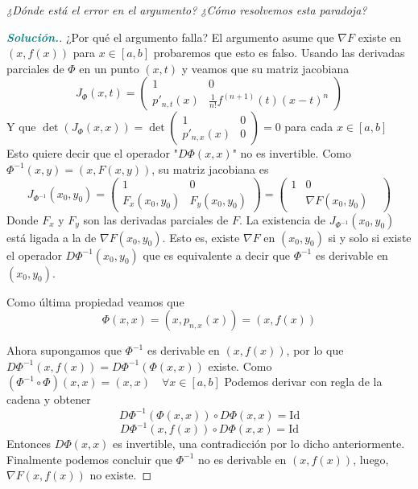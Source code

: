 \documentclass[12pt, letterpaper]{article}
\begin{document}
\vspace{0.3cm}
\noindent \textit{¿Dónde está el error en el argumento? ¿Cómo resolvemos esta paradoja?}

\begin{proof}[\textbf{\textcolor{teal}{Solución.}}]
    ¿Por qué el argumento falla?
    El argumento asume que $\nabla F$ existe en $(x, f(x))$ para $x \in [a,b]$ probaremos que esto es falso.
    Usando las derivadas parciales de $\Phi$ en un punto $(x,t)$ y veamos que su matriz jacobiana
    \[ J_\Phi(x,t) = \begin{pmatrix} 1 & 0 \\ p'_{n,t}(x) & \frac{1}{n!}f^{(n+1)}(t)(x-t)^n \end{pmatrix} \]
    Y que $\det(J_\Phi(x,x)) = \det \begin{pmatrix} 1 & 0 \\ p'_{n,x}(x) & 0 \end{pmatrix} = 0$ para cada $x \in [a,b]$
    Esto quiere decir que el operador "$D\Phi(x,x)$" no es invertible.
    Como $\Phi^{-1}(x,y) = (x, F(x,y))$, su matriz jacobiana es
    \[ J_{\Phi^{-1}}(x_0,y_0) = \begin{pmatrix} 1 & 0 \\ F_x(x_0,y_0) & F_y(x_0,y_0) \end{pmatrix} = \begin{pmatrix} 1 & 0 \\ & \nabla F(x_0,y_0) & \end{pmatrix} \]
    Donde $F_x$ y $F_y$ son las derivadas parciales de $F$. La existencia de $J_{\Phi^{-1}}(x_0,y_0)$ está ligada a la de $\nabla F(x_0,y_0)$. Esto es, existe $\nabla F$ en $(x_0,y_0)$ si y solo si existe el operador $D\Phi^{-1}(x_0,y_0)$ que es equivalente a decir que $\Phi^{-1}$ es derivable en $(x_0,y_0)$.
    
    Como última propiedad veamos que
    \[ \Phi(x,x) = (x, p_{n,x}(x)) = (x, f(x)) \]
    
    Ahora supongamos que $\Phi^{-1}$ es derivable en $(x, f(x))$, por lo que $D\Phi^{-1}(x, f(x)) = D\Phi^{-1}(\Phi(x,x))$ existe.
    Como $(\Phi^{-1} \circ \Phi)(x,x) = (x,x) \quad \forall x \in [a,b]$
    Podemos derivar con regla de la cadena y obtener
    \[ D\Phi^{-1}(\Phi(x,x)) \circ D\Phi(x,x) = \text{Id} \]
    \[ D\Phi^{-1}(x, f(x)) \circ D\Phi(x,x) = \text{Id} \]
    Entonces $D\Phi(x,x)$ es invertible, una contradicción por lo dicho anteriormente. Finalmente podemos concluir que $\Phi^{-1}$ no es derivable en $(x, f(x))$, luego, $\nabla F(x, f(x))$ no existe.
\end{proof}
\end{document}

